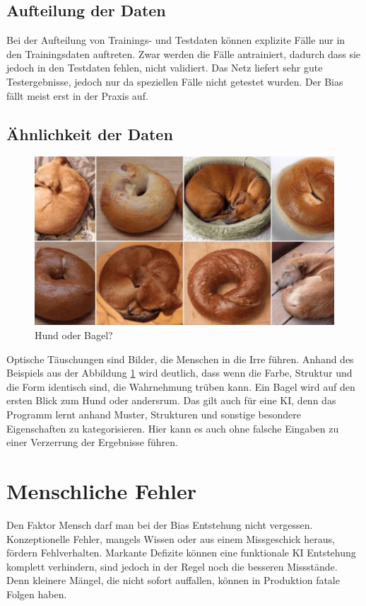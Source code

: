 \documentclass[12pt,oneside,a4paper,parskip]{scrbook}
\begin{document}
\subsection{Aufteilung der Daten}
\label{section:AufteilungDerDaten}
Bei der Aufteilung von Trainings- und Testdaten können explizite Fälle nur in den Trainingsdaten auftreten. Zwar werden die Fälle antrainiert, dadurch dass sie jedoch in den Testdaten fehlen, nicht validiert. Das Netz liefert sehr gute Testergebnisse, jedoch nur da speziellen Fälle nicht getestet wurden. Der Bias fällt meist erst in der Praxis auf.
\subsection{Ähnlichkeit der Daten}
\label{section:similarData}
\begin{figure}[h]
	\begin{center}
		\includegraphics[width=15cm]{Bilder/dog_or_bagel.jpg}
		\caption{Hund oder Bagel?\cite{dogOrBagel}}
		\label{fig:dogBagel}
	\end{center}
\end{figure}

Optische Täuschungen sind Bilder, die Menschen in die Irre führen.
Anhand des Beispiels aus der Abbildung \ref{fig:dogBagel} wird deutlich,
dass wenn die Farbe, Struktur und die Form identisch sind,
die Wahrnehmung trüben kann. Ein Bagel wird auf den ersten Blick zum Hund oder andersrum.
Das gilt auch für eine KI, denn das Programm lernt anhand Muster, Strukturen und sonstige besondere Eigenschaften zu kategorisieren. Hier kann es auch ohne falsche Eingaben zu einer Verzerrung der Ergebnisse führen.

\section{Menschliche Fehler}
\label{section:humanFehler}
Den Faktor Mensch darf man bei der Bias Entstehung nicht vergessen. Konzeptionelle Fehler, mangels Wissen oder aus einem Missgeschick heraus, fördern Fehlverhalten. Markante Defizite können eine funktionale KI Entstehung komplett verhindern, sind jedoch in der Regel noch die besseren Missstände. Denn kleinere Mängel, die nicht sofort auffallen, können in Produktion fatale Folgen haben. 
\end{document}
